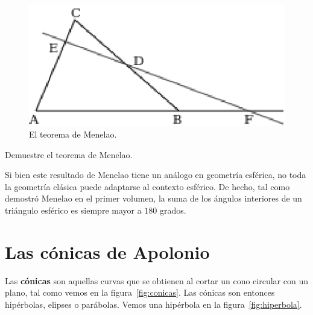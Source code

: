 \begin{figure}[h]
   \centering
   \includegraphics[scale=0.7]{images/menelao}
   \caption{El teorema de Menelao.}
   \label{fig:Menelao}
\end{figure}

\begin{exercise}
	Demuestre el teorema de Menelao.
\end{exercise}

Si bien este resultado de Menelao tiene un análogo en geometría esférica, no
toda la geometría clásica puede adaptarse al contexto esférico. De hecho, tal
como demostró Menelao en el primer volumen, la suma de los ángulos interiores
de un triángulo esférico es siempre mayor a $180$ grados. 

\section*{Las cónicas de Apolonio}

Las \textbf{cónicas} son aquellas curvas que se obtienen al cortar un cono
circular con un plano, tal como vemos en la figura~\ref{fig:conicas}. Las
cónicas son entonces hipérbolas, elipses o parábolas. Vemos una hipérbola en la
figura~\ref{fig:hiperbola}.

